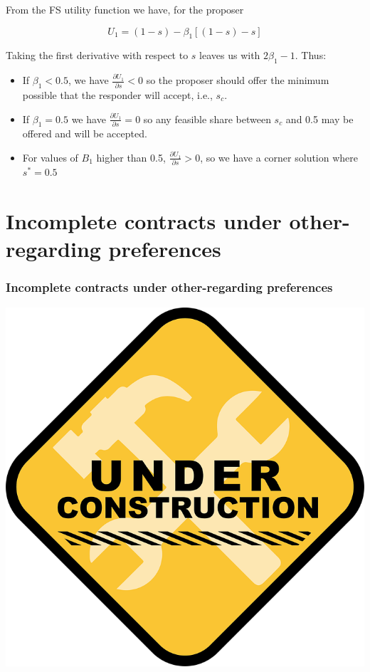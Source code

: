 \documentclass{beamer}
\begin{document}
\begin{frame}
		
	From the FS utility function we have, for the proposer 
	
	\begin{equation*}
			U_1 = \left(1-s\right) - \beta_1 \left[\left(1-s\right)-s\right]
	\end{equation*}
	
Taking the first derivative with respect to $s$ leaves us with $2\beta_1 -1$. Thus:

\begin{itemize}
	\item If $\beta_1 < 0.5$, we have $\frac{\partial U_1}{\partial s}<0$ so the proposer should offer the minimum possible that the responder will accept, i.e., $s_c$.
	\item 	If $\beta_1 = 0.5$ we have $\frac{\partial U_1}{\partial s}=0$ so any feasible share between $s_c$ and 0.5 may be offered and will be accepted.
	\item 	For values of $B_1$ higher than 0.5, $\frac{\partial U_1}{\partial s}>0$, so we have a corner solution where $s^* = 0.5$
\end{itemize} 	


\end{frame}


\section{Incomplete contracts under other-regarding preferences}


\begin{frame}
	\frametitle{Incomplete contracts under other-regarding preferences}
	\centering
	\includegraphics[scale=0.28]{UnderConstruct.png}
\end{frame}
\end{document}
